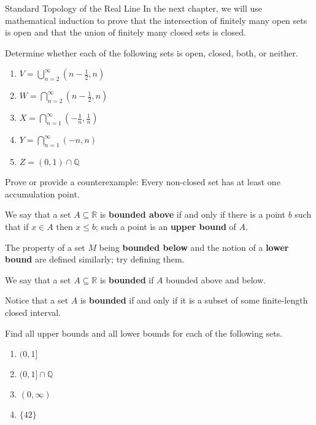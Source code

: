 \begin{section}{Standard Topology of the Real Line}
In the next chapter, we will use mathematical induction to prove that the intersection of finitely many open sets is open and that the union of finitely many closed sets is closed.

\begin{problem}
Determine whether each of the following sets is open, closed, both, or neither.
\begin{enumerate}[label=\textrm{(\alph*)}]
\item $\displaystyle V=\bigcup_{n=2}^{\infty} \left(n - \frac{1}{2},n\right)$
\item $\displaystyle W=\bigcap_{n=2}^{\infty} \left(n - \frac{1}{2},n\right)$
\item $\displaystyle X=\bigcap_{n=1}^{\infty} \left(-\frac{1}{n}, \frac{1}{n}\right)$
\item $\displaystyle Y=\bigcap_{n=1}^{\infty} \left(-n, n\right)$
\item $Z=(0,1)\cap \mathbb{Q}$
\end{enumerate}
\end{problem}

\begin{problem}
Prove or provide a counterexample: Every non-closed set has at least one accumulation point.
\end{problem}

\begin{definition}
We say that a set $A\subseteq \mathbb{R}$ is \textbf{bounded above} if and only if there is a point $b$ such that if $x\in A$ then $x\leq b$; such a point is an \textbf{upper bound} of $A$.
\end{definition}

\begin{problem}
The property of a set $M$ being \textbf{bounded below} and the notion of a \textbf{lower bound} are defined similarly; try defining them.
\end{problem}

\begin{definition}
We say that a set $A\subseteq \mathbb{R}$ is \textbf{bounded} if $A$ bounded above and below.
\end{definition}

Notice that a set $A$ is \textbf{bounded} if and only if it is a subset of some finite-length closed interval.

\begin{problem}\label{prob:find upper bounds}
Find all upper bounds and all lower bounds for each of the following sets.
\begin{enumerate}[label=\textrm{(\alph*)}]
\item $(0,1]$
\item $(0,1]\cap \mathbb{Q}$
\item $(0,\infty)$
\item $\{42\}$
\end{enumerate}
\end{problem}


\end{section}
